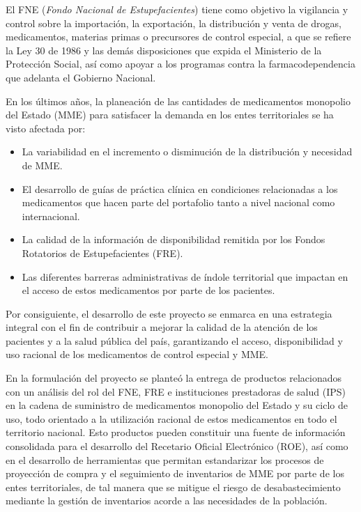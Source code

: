 \documentclass[
  oneside]{book}
\begin{document}
El FNE (\emph{Fondo Nacional de Estupefacientes}) tiene como objetivo la vigilancia y control sobre la importación, la exportación, la distribución y venta de drogas, medicamentos, materias primas o precursores de control especial, a que se refiere la Ley 30 de 1986 y las demás disposiciones que expida el Ministerio de la Protección Social, así como apoyar a los programas contra la farmacodependencia que adelanta el Gobierno Nacional.

En los últimos años, la planeación de las cantidades de medicamentos monopolio del Estado (MME) para satisfacer la demanda en los entes territoriales se ha visto afectada por:

\begin{itemize}
\item
  La variabilidad en el incremento o disminución de la distribución y necesidad de MME.
\item
  El desarrollo de guías de práctica clínica en condiciones relacionadas a los medicamentos que hacen parte del portafolio tanto a nivel nacional como internacional.
\item
  La calidad de la información de disponibilidad remitida por los Fondos Rotatorios de Estupefacientes (FRE).
\item
  Las diferentes barreras administrativas de índole territorial que impactan en el acceso de estos medicamentos por parte de los pacientes.
\end{itemize}

Por consiguiente, el desarrollo de este proyecto se enmarca en una estrategia integral con el fin de contribuir a mejorar la calidad de la atención de los pacientes y a la salud pública del país, garantizando el acceso, disponibilidad y uso racional de los medicamentos de control especial y MME.

En la formulación del proyecto se planteó la entrega de productos relacionados con un análisis del rol del FNE, FRE e instituciones prestadoras de salud (IPS) en la cadena de suministro de medicamentos monopolio del Estado y su ciclo de uso, todo orientado a la utilización racional de estos medicamentos en todo el territorio nacional. Esto productos pueden constituir una fuente de información consolidada para el desarrollo del Recetario Oficial Electrónico (ROE), así como en el desarrollo de herramientas que permitan estandarizar los procesos de proyección de compra y el seguimiento de inventarios de MME por parte de los entes territoriales, de tal manera que se mitigue el riesgo de desabastecimiento mediante la gestión de inventarios acorde a las necesidades de la población.
\end{document}
